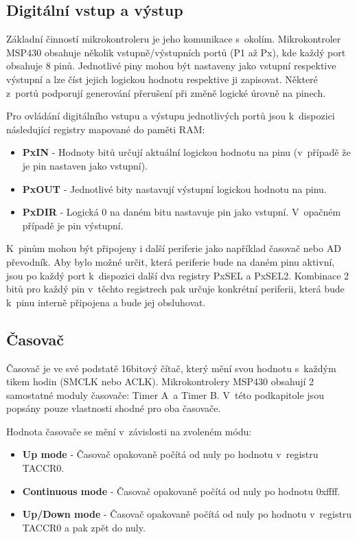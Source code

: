 \subsection{Digitální vstup a výstup}

Základní činností mikrokontroleru je jeho komunikace s~okolím. Mikrokontroler MSP430 obsahuje několik vstupně/výstupních portů (P1 až Px), kde každý port obsahuje 8 pinů. Jednotlivé piny mohou být nastaveny jako vstupní respektive výstupní a lze číst jejich logickou hodnotu respektive ji zapisovat. Některé z~portů podporují generování přerušení při změně logické úrovně na pinech.

Pro ovládání digitálního vstupu a výstupu jednotlivých portů jsou k~dispozici následující registry mapované do paměti RAM:

\begin{itemize}
\item \textbf{PxIN} - Hodnoty bitů určují aktuální logickou hodnotu na pinu (v~případě že je pin nastaven jako vstupní).
\item \textbf{PxOUT} - Jednotlivé bity nastavují výstupní logickou hodnotu na pinu.
\item \textbf{PxDIR} - Logická 0 na daném bitu nastavuje pin jako vstupní. V~opačném případě je pin výstupní.
\end{itemize}

K~pinům mohou být připojeny i další periferie jako například časovač nebo AD převodník. Aby bylo možné určit, která periferie bude na daném pinu aktivní, jsou po každý port k~dispozici další dva registry PxSEL a PxSEL2. Kombinace 2 bitů pro každý pin v~těchto registrech pak určuje konkrétní periferii, která
bude k~pinu interně připojena a bude jej obsluhovat.

\subsection{Časovač}

Časovač je ve své podstatě 16bitový čítač, který mění svou hodnotu s~každým tikem hodin (SMCLK nebo ACLK). Mikrokontrolery MSP430 obsahují 2 samostatné moduly časovače: Timer A~a Timer B. V~této podkapitole jsou popsány pouze vlastnosti shodné pro oba časovače.

Hodnota časovače se mění v~závislosti na zvoleném módu:
\begin{itemize}
\item \textbf{Up mode} - Časovač opakovaně počítá od nuly po hodnotu v~registru TACCR0.
\item \textbf{Continuous mode} - Časovač opakovaně počítá od nuly po hodnotu 0xffff.
\item \textbf{Up/Down mode} - Časovač opakovaně počítá od nuly po hodnotu v~registru TACCR0 a pak zpět do nuly.
\end{itemize}

